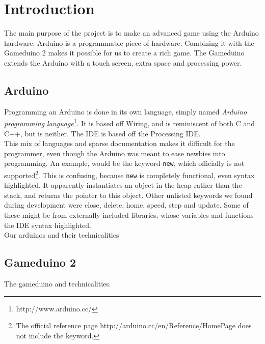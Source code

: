 \chapter{Introduction}
The main purpose of the project is to make an advanced game using the Arduino hardware.
Arduino is a programmable piece of hardware. Combining it with the  Gameduino 2 makes
it possible for us to create a rich game. The Gameduino extends the Arduino with a
touch screen, extra space and processing power.
\section{Arduino} %
Programming an Arduino is done in its own language, simply named \emph{Arduino programming language}\footnote{http://www.arduino.cc/}. It is based off Wiring, and is reminiscent of both C and C++, but is neither. The IDE is based off the Processing IDE.\\
This mix of languages and sparse documentation makes it difficult for the programmer, even though the Arduino was meant to ease newbies into programming. An example, would be the keyword {\tt new}, which officially is not supported\footnote{The official reference page http://arduino.cc/en/Reference/HomePage does not include the keyword.}. This is confusing, because {\tt new} is completely functional, even syntax highlighted. It apparently instantiates an object in the heap rather than the stack, and returns the pointer to this object. Other unlisted keywords we found during development were close, delete, home, speed, step and update. Some of these might be from externally included libraries, whose variables and functions the IDE syntax highlighted.\\ %
Our arduinos and their technicalities
\section{Gameduino 2}
The gameduino and technicalities.